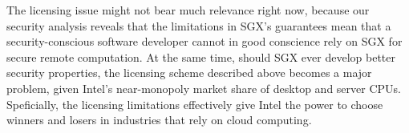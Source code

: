 The licensing issue might not bear much relevance right now, because our
security analysis reveals that the limitations in SGX's guarantees mean that a
security-conscious software developer cannot in good conscience rely on SGX for
secure remote computation. At the same time, should SGX ever develop better
security properties, the licensing scheme described above becomes a major
problem, given Intel's near-monopoly market share of desktop and server CPUs.
Speficially, the licensing limitations effectively give Intel the power to
choose winners and losers in industries that rely on cloud computing.

